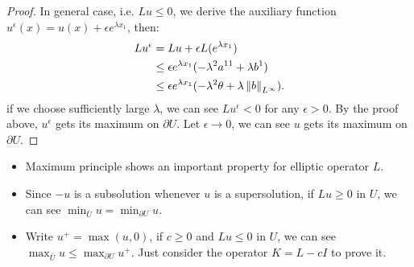 \begin{proof}
    In general case, i.e. $Lu\le 0$, we derive the auxiliary function $u^{\epsilon}(x)=u(x)+\epsilon e^{\lambda x_{1}}$, then:
    \begin{equation}
        \begin{aligned}
            Lu^{\epsilon}&=Lu+\epsilon L(e^{\lambda x_{1}})\\
            &\le \epsilon e^{\lambda x_{1}}(-\lambda^{2}a^{11}+\lambda b^{1})\\
            &\le \epsilon e^{\lambda x_{1}}(-\lambda^{2}\theta+\lambda\left\|b\right\|_{L^{\infty}}).
        \end{aligned}
    \end{equation}
    if we choose sufficiently large $\lambda$, we can see $Lu^{\epsilon}<0$ for any $\epsilon>0$. By the proof above, $u^{\epsilon}$ gets its maximum on $\partial U$. Let $\epsilon\rightarrow 0$, we can see $u$ gets its maximum on $\partial U$.
\end{proof}
\begin{remark}
    \begin{itemize}
        \item Maximum principle shows an important property for elliptic operator $L$.
        \item Since $-u$ is a subsolution whenever $u$ is a supersolution, if $Lu\ge 0$ in $U$, we can see $\min_{\bar{U}}u=\min_{\partial U}u.$
        \item Write $u^{+}=\max(u,0)$, if $c\ge 0$ and $Lu\le 0$ in $U$, we can see $\max_{\bar{U}}u\le\max_{\partial U}u^{+}$. Just consider the operator $K=L-cI$ to prove it.
    \end{itemize}
\end{remark}
